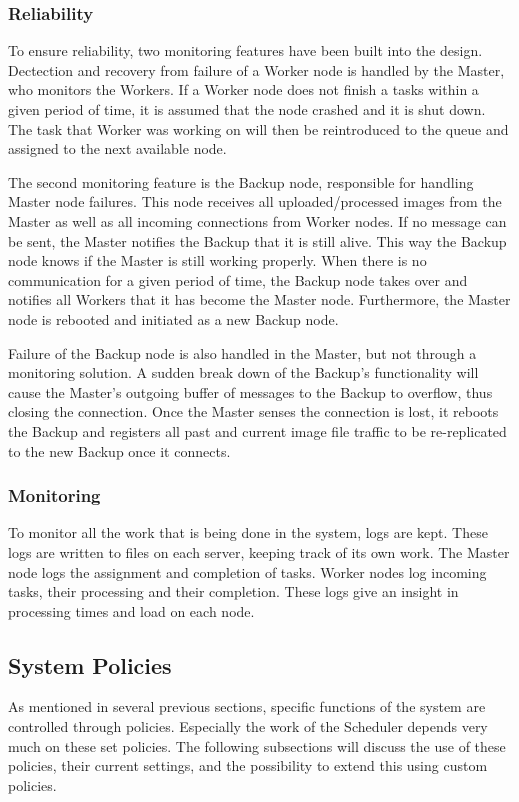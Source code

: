 \documentclass{acm_proc_article-sp}
\begin{document}
\subsubsection{Reliability}
To ensure reliability, two monitoring features have been built into the design.
Dectection and recovery from failure of a Worker node is handled by the Master, who monitors the Workers.
If a Worker node does not finish a tasks within a given period of time, it is assumed that the node crashed and it is shut down.
The task that Worker was working on will then be reintroduced to the queue and assigned to the next available node.

The second monitoring feature is the Backup node, responsible for handling Master node failures.
This node receives all uploaded/processed images from the Master as well as all incoming connections from Worker nodes.
If no message can be sent, the Master notifies the Backup that it is still alive.
This way the Backup node knows if the Master is still working properly.
When there is no communication for a given period of time, the Backup node takes over and notifies all Workers that it has become the Master node.
Furthermore, the Master node is rebooted and initiated as a new Backup node.

Failure of the Backup node is also handled in the Master, but not through a monitoring solution.
A sudden break down of the Backup's functionality will cause the Master's outgoing buffer of messages to the Backup to overflow, thus closing the connection. Once the Master senses the connection is lost, it reboots the Backup and registers all past and current image file traffic to be re-replicated to the new Backup once it connects.

\subsubsection{Monitoring}
To monitor all the work that is being done in the system, logs are kept.
These logs are written to files on each server, keeping track of its own work.
The Master node logs the assignment and completion of tasks.
Worker nodes log incoming tasks, their processing and their completion.
These logs give an insight in processing times and load on each node.

\subsection{System Policies}
\label{sec:policies}
As mentioned in several previous sections, specific functions of the system are controlled through policies.
Especially the work of the Scheduler depends very much on these set policies.
The following subsections will discuss the use of these policies, their current settings, and the possibility to extend this using custom policies.
\end{document}
